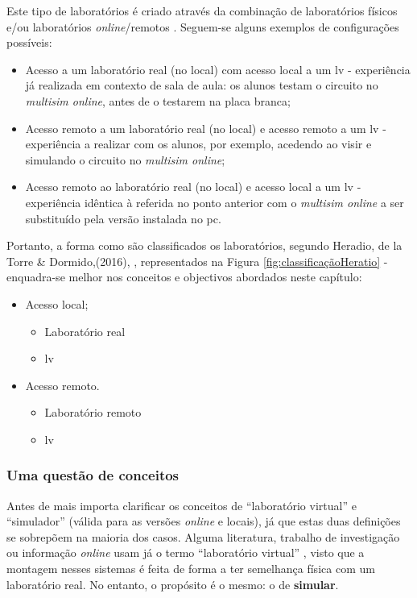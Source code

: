 Este tipo de laboratórios é criado através da combinação de laboratórios físicos e/ou laboratórios \textit{online}/remotos \cite{Zapata-Rivera}. Seguem-se alguns exemplos de configurações possíveis:
\begin{itemize}
    \item Acesso a um laboratório real (no local) com acesso local a um \acrfull{lv} - experiência já realizada em contexto de sala de aula: os alunos testam o circuito no \textit{multisim online}, antes de o testarem na placa branca;
    \item Acesso remoto a um laboratório real (no local) e acesso remoto a um \acrshort{lv} - experiência a realizar com os alunos, por exemplo, acedendo ao \acrshort{visir} e simulando o circuito no \textit{multisim online};
    \item Acesso remoto ao laboratório real (no local) e acesso local a um \acrshort{lv} - experiência idêntica à referida no ponto anterior com o \textit{multisim online} a ser substituído pela versão instalada no \acrshort{pc}.
\end{itemize}

Portanto, a forma como são classificados os laboratórios, segundo Heradio, de la Torre \& Dormido,(2016), \cite{HERADIO20161}, representados na Figura \ref{fig:classificaçãoHeratio} - enquadra-se melhor nos conceitos e objectivos abordados neste capítulo:
\begin{itemize}
    \item Acesso local;
          \begin{itemize}
              \item Laboratório real
              \item \acrshort{lv}
          \end{itemize}
    \item Acesso remoto.
          \begin{itemize}
              \item Laboratório remoto
              \item \acrshort{lv}
          \end{itemize}
\end{itemize}

\subsubsection{Uma questão de conceitos}
Antes de mais importa clarificar os conceitos de ``laboratório virtual'' e ``simulador'' (válida para as versões \textit{online} e locais), já que estas duas definições se sobrepõem na maioria dos casos.
Alguma literatura, trabalho de investigação ou informação \textit{online} usam já o termo ``laboratório virtual'' \cite{BRINSON2015218}\cite{virtuallabng}\cite{EMaster2024May}, visto que a montagem nesses sistemas é feita de forma a ter semelhança física com um laboratório real. No entanto, o propósito é o mesmo: o de \textbf{simular}.


